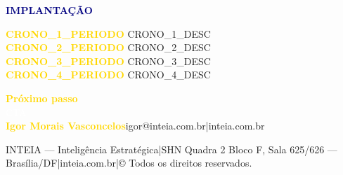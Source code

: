 \documentclass[a4paper,landscape]{article}
\begin{document}
\begin{minipage}[t]{0.31\textwidth}
\vspace{3mm}

{\fontsize{10}{12}\selectfont\textsf{\textcolor{navy}{}\;\textcolor{navy}{\textbf{IMPLANTA\c{C}\~AO}}}}

\begin{tcolorbox}[box, colback=white, colframe=bordergray, boxrule=0.4pt]
\fontsize{8}{11}\selectfont\textsf{%
\textcolor{gold}{\textbf{{{CRONO_1_PERIODO}}}} \textcolor{textsecondary}{{{CRONO_1_DESC}}}\\[1mm]
\textcolor{gold}{\textbf{{{CRONO_2_PERIODO}}}} \textcolor{textsecondary}{{{CRONO_2_DESC}}}\\[1mm]
\textcolor{gold}{\textbf{{{CRONO_3_PERIODO}}}} \textcolor{textsecondary}{{{CRONO_3_DESC}}}\\[1mm]
\textcolor{gold}{\textbf{{{CRONO_4_PERIODO}}}} \textcolor{textsecondary}{{{CRONO_4_DESC}}}%
}
\end{tcolorbox}

\vspace{3mm}

\begin{tcolorbox}[box, colback=headerbg, colframe=headerbg, halign=center, top=3mm, bottom=3mm]
\fontsize{8.5}{10.5}\selectfont\textsf{%
\textcolor{gold}{\;\textbf{Pr\'oximo passo}}\\[1.2mm]
\textcolor{white}{{{CTA}}}\\[2mm]
\textcolor{gold}{\textbf{Igor Morais Vasconcelos}}\;\;\textcolor{goldlight}{igor@inteia.com.br\;\;|\;\;inteia.com.br}%
}
\end{tcolorbox}

\end{minipage}

\vfill
\begin{center}
\fontsize{5.5}{7}\selectfont\textsf{%
\textcolor{textlight}{INTEIA --- Intelig\^encia Estrat\'egica\;\;|\;\;SHN Quadra 2 Bloco F, Sala 625/626 --- Bras\'ilia/DF\;\;|\;\;inteia.com.br\;\;|\;\;\copyright{} Todos os direitos reservados.}
}
\end{center}
\end{document}
